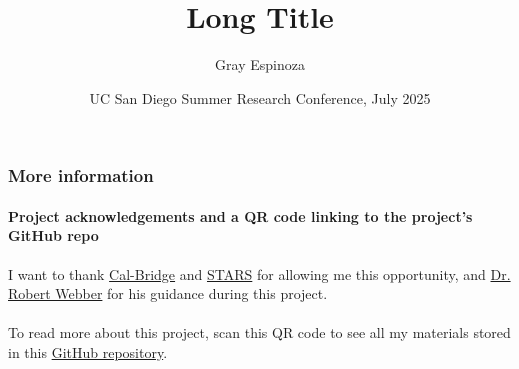 \documentclass[aspectratio=43]{beamer}
\title[Short Title]{Long Title}
\author{Gray Espinoza}
\institute{University of California\\San Diego}
\date[13 July 2025]{UC San Diego Summer Research Conference, July 2025}
\begin{document}
\begin{frame}[plain]
  \titlepage
\end{frame}

\begin{frame}
  \frametitle{More information}
  \framesubtitle{Project acknowledgements and a QR code linking to
  the project's GitHub repo}

  I want to thank \href{https://calbridge.org}{Cal-Bridge} and
  \href{https://grad.ucsd.edu/oar2/oar2office/programs/undergraduate-programs/stars}{STARS}
  for allowing me this opportunity, and
  \href{https://sites.google.com/ucsd.edu/rwebber}{Dr. Robert Webber}
  for his guidance during this project.
  \\~\\

  To read more about this project, scan this QR code to see all my
  materials stored in this
  \href{https://github.com/grayespinoza/cbsp25}{GitHub repository}.
  \\~\\

\end{frame}
\end{document}
